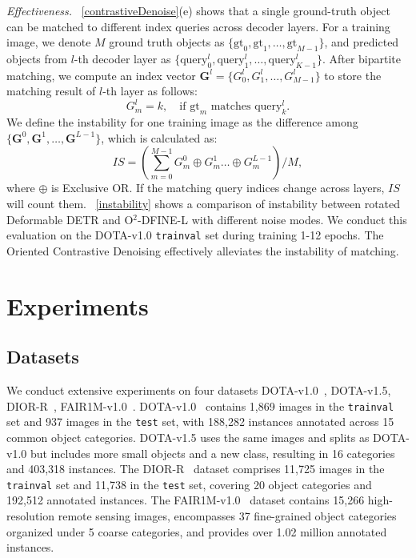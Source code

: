 \documentclass[lettersize,journal]{IEEEtran}
\begin{document}
\textit{Effectiveness.}
\figurename~\ref{contrastiveDenoise}(e) shows that a single ground-truth object can be matched to different index queries across decoder layers.
For a training image, we denote $M$ ground truth objects as $\{\text{gt}_0,\text{gt}_1, \dots ,\text{gt}_{M-1}\}$, and predicted objects from $l$-th decoder layer as $\{\text{query}^l_0,\text{query}^l_1,\dots,\text{query}^l_{K-1}\}$. After bipartite matching, we compute an index vector $\mathbf{G}^l=\{G^l_0,G^l_1,\dots,G^l_{M-1}\}$ to store the matching result of $l$-th layer as follows:
\begin{equation}
    G^l_m = k, \quad \text{if } \text{gt}_m \text{ matches } \text{query}^l_k.
\end{equation}
We define the instability for one training image as the difference among $\{\mathbf{G}^0,\mathbf{G}^1,\dots,\mathbf{G}^{L-1}\}$, which is calculated as:
\begin{equation}
  IS = (\sum_{m=0}^{M-1} G^0_m \oplus G^1_m \dots \oplus G^{L-1}_m)/M,
\end{equation}
where $\oplus$ is Exclusive OR. If the matching query indices change across layers, $IS$ will count them. \figurename~\ref{instability} shows a comparison of instability between rotated Deformable DETR and O$^2$-DFINE-L with different noise modes. We conduct this evaluation on the DOTA-v1.0 \texttt{trainval} set during training 1-12 epochs. The Oriented Contrastive Denoising effectively alleviates the instability of matching. 

\TableExpSetting

\section{Experiments}
\subsection{Datasets}
We conduct extensive experiments on four datasets DOTA-v1.0~\cite{dotav1.0}, DOTA-v1.5, DIOR-R~\cite{dior}, FAIR1M-v1.0~\cite{fair1m}.
DOTA-v1.0~\cite{dotav1.0} contains 1,869 images in the \texttt{trainval} set and 937 images in the \texttt{test} set, with 188,282 instances annotated across 15 common object categories. DOTA-v1.5 uses the same images and splits as DOTA-v1.0 but includes more small objects and a new class, resulting in 16 categories and 403,318 instances.
The DIOR-R~\cite{dior} dataset comprises 11,725 images in the \texttt{trainval} set and 11,738 in the \texttt{test} set, covering 20 object categories and 192,512 annotated instances.
The FAIR1M-v1.0~\cite{fair1m} dataset contains 15,266 high-resolution remote sensing images, encompasses 37 fine-grained object categories organized under 5 coarse categories, and provides over 1.02 million annotated instances.
\end{document}
